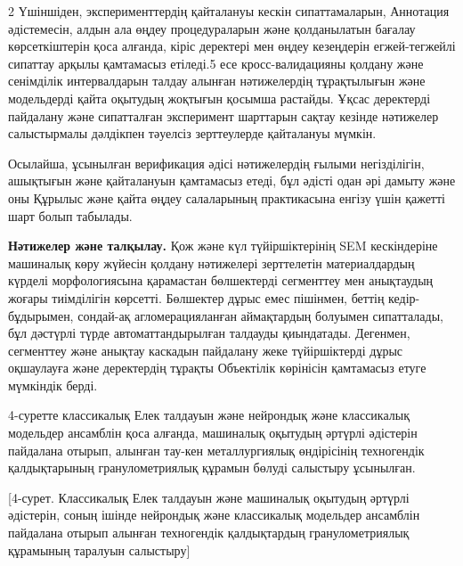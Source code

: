 \begin{multicols}{2}
Үшіншіден, эксперименттердің қайталануы кескін сипаттамаларын, Аннотация
әдістемесін, алдын ала өңдеу процедураларын және қолданылатын бағалау
көрсеткіштерін қоса алғанда, кіріс деректері мен өңдеу кезеңдерін
егжей-тегжейлі сипаттау арқылы қамтамасыз етіледі.5 есе
кросс-валидацияны қолдану және сенімділік интервалдарын талдау алынған
нәтижелердің тұрақтылығын және модельдерді қайта оқытудың жоқтығын
қосымша растайды. Ұқсас деректерді пайдалану және сипатталған
эксперимент шарттарын сақтау кезінде нәтижелер салыстырмалы дәлдікпен
тәуелсіз зерттеулерде қайталануы мүмкін.

Осылайша, ұсынылған верификация әдісі нәтижелердің ғылыми негізділігін,
ашықтығын және қайталануын қамтамасыз етеді, бұл әдісті одан әрі дамыту
және оны Құрылыс және қайта өңдеу салаларының практикасына енгізу үшін
қажетті шарт болып табылады.

{\bfseries Нәтижелер және талқылау.} Қож және күл түйіршіктерінің SEM
кескіндеріне машиналық көру жүйесін қолдану нәтижелері зерттелетін
материалдардың күрделі морфологиясына қарамастан бөлшектерді сегменттеу
мен анықтаудың жоғары тиімділігін көрсетті. Бөлшектер дұрыс емес
пішінмен, беттің кедір-бұдырымен, сондай-ақ агломерацияланған
аймақтардың болуымен сипатталады, бұл дәстүрлі түрде автоматтандырылған
талдауды қиындатады. Дегенмен, сегменттеу және анықтау каскадын
пайдалану жеке түйіршіктерді дұрыс оқшаулауға және деректердің тұрақты
Объектілік көрінісін қамтамасыз етуге мүмкіндік берді.

4-суретте классикалық Елек талдауын және нейрондық және классикалық
модельдер ансамблін қоса алғанда, машиналық оқытудың әртүрлі әдістерін
пайдалана отырып, алынған тау-кен металлургиялық өндірісінің техногендік
қалдықтарының гранулометриялық құрамын бөлуді салыстыру ұсынылған.
\end{multicols}

[4-сурет. Классикалық Елек талдауын және машиналық оқытудың
әртүрлі әдістерін, соның ішінде нейрондық және классикалық модельдер
ансамблін пайдалана отырып алынған техногендік қалдықтардың
гранулометриялық құрамының таралуын салыстыру]

